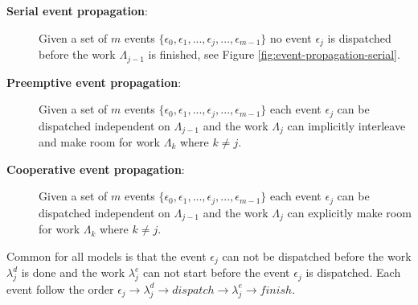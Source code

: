 
\begin{description}

    \item[\textbf{Serial event propagation}:] Given a set of $m$ events $\{
            \epsilon_0, \epsilon_1, ..., \epsilon_j, ..., \epsilon_{m-1} \}$ no
        event $\epsilon_j$ is dispatched before the work $\Lambda_{j-1}$ is
        finished, see Figure \ref{fig:event-propagation-serial}.

    \item[\textbf{Preemptive event propagation}:] Given a set of $m$ events $\{
            \epsilon_0, \epsilon_1, ..., \epsilon_j, ..., \epsilon_{m-1} \}$
        each event $\epsilon_j$ can be dispatched independent on
        $\Lambda_{j-1}$ and the work $\Lambda_j$ can implicitly interleave and
        make room for work $\Lambda_k$ where $k \ne j$.

    \item[\textbf{Cooperative event propagation}:] Given a set of $m$ events
        $\{ \epsilon_0, \epsilon_1, ..., \epsilon_j, ..., \epsilon_{m-1} \}$
        each event $\epsilon_j$ can be dispatched independent on
        $\Lambda_{j-1}$ and the work $\Lambda_j$ can explicitly make room for
        work $\Lambda_k$ where $k \ne j$.

\end{description}

Common for all models is that the event $\epsilon_j$ can not be dispatched
before the work $\lambda^d_j$ is done and the work $\lambda^e_j$ can not start
before the event $\epsilon_j$ is dispatched. Each event follow the order
$\epsilon_j \rightarrow \lambda^d_j \rightarrow dispatch \rightarrow
\lambda^e_j \rightarrow finish$.

